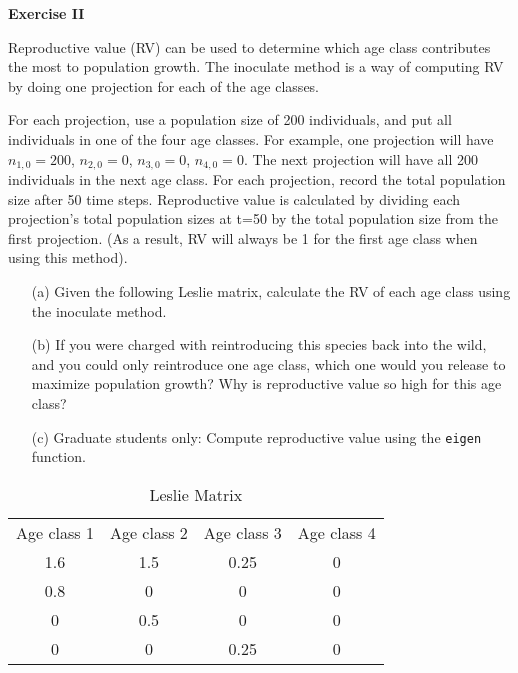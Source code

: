 \documentclass[12pt]{article}\usepackage[]{graphicx}\usepackage[]{color}
\begin{document}
\clearpage

{\bf Exercise II \\}

Reproductive value (RV) can be used to determine which age class
contributes the most to population growth. The inoculate method is a
way of computing RV by doing one projection for each of the age
classes.

For each projection, use a population size of 200 individuals, and put
all individuals in one of the four age classes. For example, one
projection will have $n_{1,0}=200$, $n_{2,0}=0$, $n_{3,0}=0$, $n_{4,0}=0$. The next
projection will have all 200 individuals in the next age class. For
each projection, record the total population size after 50 time
steps. Reproductive value is calculated by dividing each projection's
total population sizes at t=50 by the total population size from the
first projection. (As a result, RV will always be 1 for the first age
class when using this method).

\begin{itemize}
  \item[(a)] Given the following Leslie matrix, calculate the RV of each
    age class using the inoculate method.
  \item[(b)] If you were charged with reintroducing this species back
    into the wild, and you could only reintroduce one age class, which
    one would you release to maximize population growth? Why is
    reproductive value so high for this age class?
  \item[(c)] Graduate students only: Compute reproductive value using
    the \texttt{eigen} function.
\end{itemize}

\begin{table}[h]
  \centering
  \caption{Leslie Matrix}
  \begin{tabular}{cccc}
    \hline
    Age class 1 & Age class 2 & Age class 3 & Age class 4 \\
    1.6 & 1.5 & 0.25 & 0 \\
    0.8 & 0   & 0    & 0 \\
    0   & 0.5 & 0    & 0 \\
    0   & 0   & 0.25 & 0 \\
    \hline
  \end{tabular}
  \label{tab:A}
\end{table}



\clearpage
\end{document}
